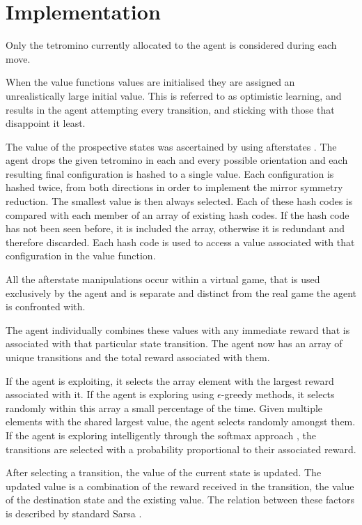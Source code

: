 \documentclass[a4paper,twocolumn]{article}
\begin{document}
\section{Implementation}

Only the tetromino currently allocated to the agent is considered during each move.

When the value functions values are initialised they are assigned an unrealistically large initial value. This is referred to as optimistic learning, and results in the agent attempting every transition, and sticking with those that disappoint it least.

The value of the prospective states was ascertained by using afterstates \citep{suttonbarto}. The agent drops the given tetromino in each and every possible orientation and each resulting final configuration is hashed to a single value.  Each configuration is hashed twice, from both directions in order to implement the mirror symmetry reduction. The smallest value is then always selected. Each of these hash codes is compared with each member of an array of existing hash codes. If the hash code has not been seen before, it is included the array, otherwise it is redundant and therefore discarded. Each hash code is used to access a value associated with that configuration in the value function.

All the afterstate manipulations occur within a virtual game, that is used exclusively by the agent and is separate and distinct from the real game the agent is confronted with.

The agent individually combines these values with any immediate reward that is associated with that particular state transition. The agent now has an array of unique transitions and the total reward associated with them.

If the agent is exploiting, it selects the array element with the largest reward associated with it. If the agent is exploring using $\epsilon$-greedy methods, it selects randomly within this array a small percentage of the time. Given multiple elements with the shared largest value, the agent selects randomly amongst them. If the agent is exploring intelligently through the softmax approach \citep{suttonbarto}, the transitions are selected with a probability proportional to their associated reward.

After selecting a transition, the value of the current state is updated. The updated value is a combination of the reward received in the transition, the value of the destination state and the existing value. The relation between these factors is described by standard Sarsa \citep{suttonbarto}.
\end{document}
